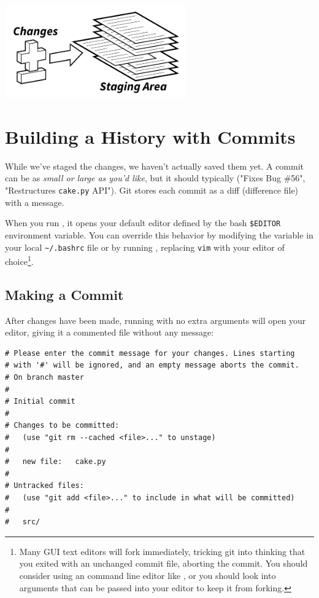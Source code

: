 \documentclass[11pt,letterpaper,twoside]{report}
\begin{document}
\vspace{\fill}
\begin{flushright}
\includegraphics[height=4cm]{resources/staging_abstract.pdf}

\end{flushright}
\vspace*{\fill}

\chapter{Building a History with Commits}

While we've staged the changes, we haven't actually saved them yet. A commit can
be as \emph{small or large as you'd like}, but it should typically
 ("Fixes Bug \#56", "Restructures
\texttt{cake.py} API"). Git stores each commit as a diff (difference file) with
a message.

When you run , it opens your default editor defined by the
bash \texttt{\$EDITOR} environment variable. You can override this behavior by
modifying the variable in your local \texttt{\textasciitilde/.bashrc} file or by
running , replacing \texttt{vim}
with your editor of choice\footnote{Many GUI text editors will fork immediately,
tricking git into thinking that you exited with an unchanged commit file,
aborting the commit. You should consider using an command line editor like
, or you should look into arguments that can be passed into your
editor to keep it from forking.}.

\section{Making a Commit}

After changes have been made, running  with no extra arguments
will open your editor, giving it a commented file without any message:

\begin{lstlisting}[numbers=none]
# Please enter the commit message for your changes. Lines starting
# with '#' will be ignored, and an empty message aborts the commit.
# On branch master
#
# Initial commit
#
# Changes to be committed:
#   (use "git rm --cached <file>..." to unstage)
#
#   new file:   cake.py
#
# Untracked files:
#   (use "git add <file>..." to include in what will be committed)
#
#   src/
\end{lstlisting}
\end{document}
